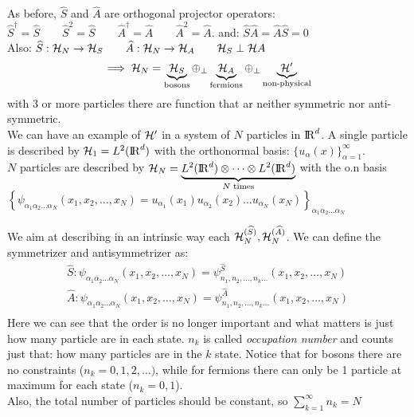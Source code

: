 As before, $\widehat S$ and $\widehat A$ are orthogonal projector operators:\\
$\widehat S^\dag = \widehat S \qquad \widehat S^2 = \widehat S \qquad \widehat A^\dag = \widehat A \qquad \widehat A^2 = \widehat A$. \qquad and: $\widehat S\widehat A = \widehat A\widehat S = 0$\\
Also: $\widehat S : \mathcal{H}_N \to \mathcal{H}_S \qquad \widehat A : \mathcal{H}_N \to \mathcal{H}_A \qquad \mathcal{H}_S \perp \mathcal{H} A $\\
$$\implies \mathcal{H}_N = \underbrace{\mathcal{H}_S}_{\text{bosons}} \oplus_\perp \underbrace{\mathcal{H}_A}_{\text{fermions}} \oplus_\perp \underbrace{\mathcal{H}'}_{\text{non-physical}} $$
with 3 or more particles there are function that ar neither symmetric nor anti-symmetric.\\

We can have an example of $\mathcal{H}'$ in a system of $N$ particles in ${\rm I\!R}^d$. A single particle is described by $\mathcal{H}_1 = L^2({\rm I\!R}^d)$ with the orthonormal basis: $\{ u_\alpha(x)\}_{\alpha = 1}^\infty$.\\
$N$ particles are described by $\mathcal{H}_N = \underbrace{L^2({\rm I\!R}^d) \otimes \dots \otimes L^2({\rm I\!R}^d)}_{\text{$N$ times}}$ with the o.n basis\\ 
$\left\{ \psi_{\alpha_1\alpha_2\dots \alpha_N}(x_1,x_2,\dots,x_N) = u_{\alpha_1}(x_1) u_{\alpha_2}(x_2)\dots u_{\alpha_N}(x_N) \right\}_{\alpha_1\alpha_2\dots\alpha_N}$ \\

We aim at describing in an intrinsic way each $\mathcal{H}_N^{(\widehat S)}, \mathcal{H}_N^{(\widehat A)}$.
We can define the symmetrizer and antisymmetrizer as:
\begin{align*}
    \widehat S : \psi_{\alpha_1\alpha_2\dots\alpha_N}(x_1,x_2,\dots,x_N) = \psi_{n_1,n_2,\dots, n_k \dots}^{\widehat S} (x_1, x_2, \dots, x_N) \\
    \widehat A : \psi_{\alpha_1\alpha_2\dots\alpha_N}(x_1,x_2,\dots,x_N) = \psi_{n_1,n_2,\dots, n_k \dots}^{\widehat A} (x_1, x_2, \dots, x_N) \\
\end{align*}
Here we can see that the order is no longer important and what matters is just how many particle are in each state. $n_k$ is called \textit{occupation number} and counts just that: how many particles are in the $k$ state. Notice that for bosons there are no constraints ($n_k = 0,1,2,\dots)$, while for fermions there can only be 1 particle at maximum for each state ($n_k = 0,1$).\\
Also, the total number of particles should be constant, so $\boxed{\sum_{k=1}^\infty n_k = N}$\\


